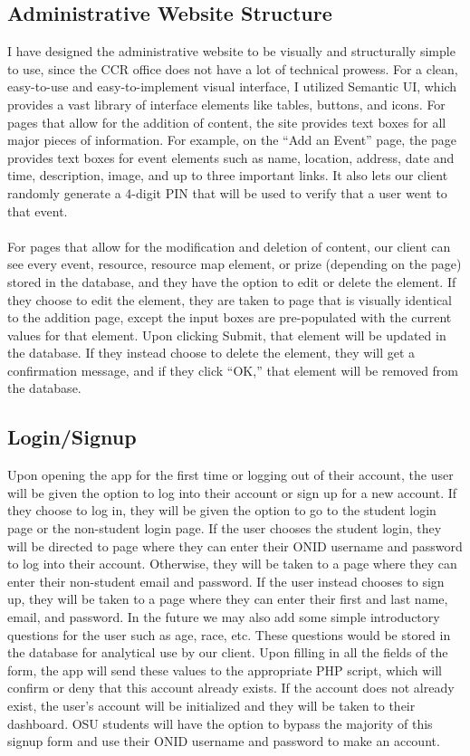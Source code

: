 \documentclass[onecolumn, draftclsnofoot,10pt, compsoc]{IEEEtran}
\begin{document}
	\subsection{Administrative Website Structure}
		I have designed the administrative website to be visually and structurally simple to use, since the CCR office does not have a lot of technical prowess. For a clean, easy-to-use and easy-to-implement visual interface, I utilized Semantic UI, which provides a vast library of interface elements like tables, buttons, and icons. For pages that allow for the addition of content, the site provides text boxes for all major pieces of information. For example, on the “Add an Event” page, the page provides text boxes for event elements such as name, location, address, date and time, description, image, and up to three important links. It also lets our client randomly generate a 4-digit PIN that will be used to verify that a user went to that event. \\ \\
		For pages that allow for the modification and deletion of content, our client can see every event, resource, resource map element, or prize (depending on the page) stored in the database, and they have the option to edit or delete the element. If they choose to edit the element, they are taken to page that is visually identical to the addition page, except the input boxes are pre-populated with the current values for that element. Upon clicking Submit, that element will be updated in the database. If they instead choose to delete the element, they will get a confirmation message, and if they click “OK,” that element will be removed from the database.

	\subsection{Login/Signup}
		Upon opening the app for the first time or logging out of their account, the user will be given the option to log into their account or sign up for a new account. If they choose to log in, they will be given the option to go to the student login page or the non-student login page. If the user chooses the student login, they will be directed to page where they can enter their ONID username and password to log into their account. Otherwise, they will be taken to a page where they can enter their non-student email and password. If the user instead chooses to sign up, they will be taken to a page where they can enter their first and last name, email, and password. In the future we may also add some simple introductory questions for the user such as age, race, etc. These questions would be stored in the database for analytical use by our client. Upon filling in all the fields of the form, the app will send these values to the appropriate PHP script, which will confirm or deny that this account already exists. If the account does not already exist, the user’s account will be initialized and they will be taken to their dashboard. OSU students will have the option to bypass the majority of this signup form and use their ONID username and password to make an account. \\ \\
\end{document}
